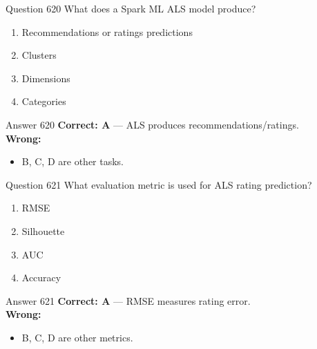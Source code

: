 \documentclass[aspectratio=169,11pt]{beamer}
\begin{document}
	\begin{frame}{Question 620}
		What does a Spark ML ALS model produce?
		\begin{enumerate}[label=\Alph*.]
			\item Recommendations or ratings predictions
			\item Clusters
			\item Dimensions
			\item Categories
		\end{enumerate}
	\end{frame}
	\begin{frame}{Answer 620}
		\textbf{Correct: A} --- ALS produces recommendations/ratings.\\
		\vspace{0.5em}
		\textbf{Wrong:}
		\begin{itemize}
			\item B, C, D are other tasks.
		\end{itemize}
	\end{frame}
	
	\begin{frame}{Question 621}
		What evaluation metric is used for ALS rating prediction?
		\begin{enumerate}[label=\Alph*.]
			\item RMSE
			\item Silhouette
			\item AUC
			\item Accuracy
		\end{enumerate}
	\end{frame}
	\begin{frame}{Answer 621}
		\textbf{Correct: A} --- RMSE measures rating error.\\
		\vspace{0.5em}
		\textbf{Wrong:}
		\begin{itemize}
			\item B, C, D are other metrics.
		\end{itemize}
	\end{frame}
	
\end{document}
